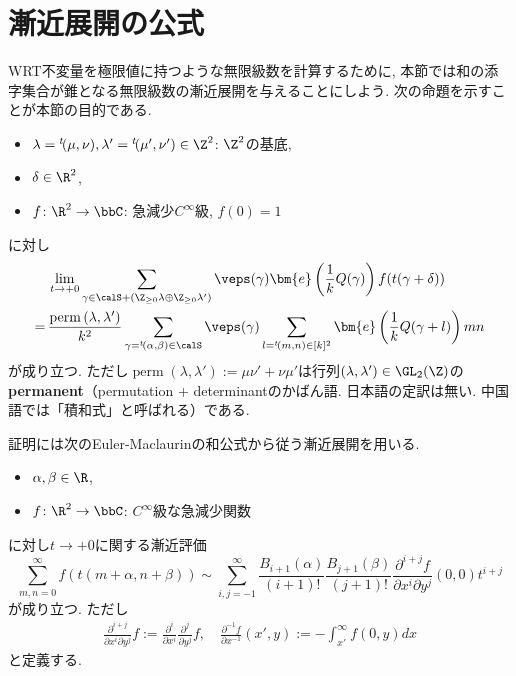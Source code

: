 \documentclass[11pt,b5paper,oneside,lualatex]{ltjsarticle} %
\DeclareMathOperator{\perm}{perm}
\numberwithin{equation}{section} %
\begin{document}

\section{漸近展開の公式} \label{sec:asymptotic_formula}


WRT不変量を極限値に持つような無限級数を計算するために, 本節では和の添字集合が錐となる無限級数の漸近展開を与えることにしよう. 
次の命題を示すことが本節の目的である. 

\begin{prop} \label{prop:infin_series_asymptotic}
	\begin{itemize}
		\item $ \lambda = {}^t\!(\mu, \nu), \lambda' = {}^t\!(\mu', \nu') \in \Z^2 $: $ \Z^2 $の基底, 
		\item $ \delta \in \R^2 $,
		\item $ f \colon \R^2 \to \bbC $: 急減少$ C^\infty $級, $ f(0) = 1 $
	\end{itemize}
	に対し
	\begin{align}
		&\lim_{t \to +0} 
		\sum_{\gamma \in \calS + (\Z_{\ge 0} \lambda \oplus \Z_{\ge 0} \lambda')} 
		\veps(\gamma)
		\bm{e} \left( \frac{1}{k} Q(\gamma) \right)
		f(t(\gamma + \delta))
		\\
		= \,
		&\frac{\perm{(\lambda, \lambda')}}{k^2}
		\sum_{\gamma = {}^t\!(\alpha, \beta) \in \calS} 
		\veps(\gamma)
		\sum_{l = {}^t\!(m, n) \in [k]^2}
		\bm{e}\left( \frac{1}{k} Q(\gamma + l) \right) mn
	\end{align}
	が成り立つ. 
	ただし$ \perm{(\lambda, \lambda')} := \mu \nu' + \nu \mu' $は行列$ (\lambda, \lambda') \in \GL_2(\Z) $の\textbf{permanent}（permutation + determinantのかばん語. 日本語の定訳は無い. 中国語では「積和式」と呼ばれる）である. 
\end{prop}

証明には次のEuler-Maclaurinの和公式から従う漸近展開を用いる. 

\begin{lem} \label{lem:Euler-Maclaurin}	
	\begin{itemize}
		\item $ \alpha, \beta \in \R$,
		\item $ f \colon \R^2 \to \bbC $: $ C^\infty $級な急減少関数
	\end{itemize}
	に対し$ t \to +0 $に関する漸近評価
	\[
	\sum_{m, n = 0}^{\infty} f(t(m+\alpha, n+\beta))
	\sim \sum_{i, j = -1}^{\infty} \frac{B_{i+1}(\alpha)}{(i+1)!} \frac{B_{j+1}(\beta)}{(j+1)!}
	\frac{\partial^{i+j} f}{\partial x^i \partial y^j} (0, 0) t^{i+j}
	\]
	が成り立つ. 
	ただし
	\begin{align}
		\frac{\partial^{i+j} }{\partial x^i \partial y^j} f := \frac{\partial^{i}}{\partial x^i} \frac{\partial^{j}}{\partial y^j} f, \quad
		\frac{\partial^{-1} f}{\partial x^{-1}} (x', y) := -\int_{x'}^\infty f(0, y) dx
	\end{align}
	と定義する. 
\end{lem}
\end{document}
